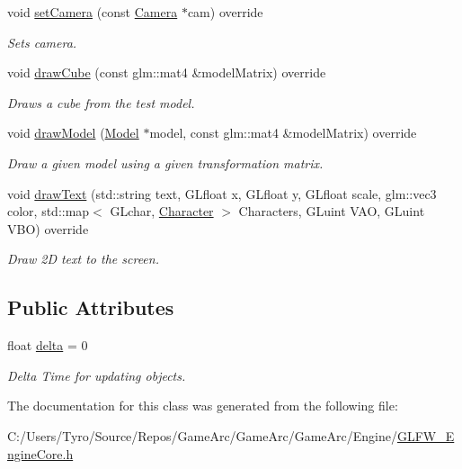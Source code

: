 \begin{DoxyCompactItemize}
void \mbox{\hyperlink{class_g_l_f_w___engine_core_a2aba4fb8a635f96fc4057ba841670a29}{set\+Camera}} (const \mbox{\hyperlink{class_camera}{Camera}} $\ast$cam) override
\begin{DoxyCompactList}\small\item\em Sets camera. \end{DoxyCompactList}\item 
\mbox{\label{class_g_l_f_w___engine_core_a728d1f6ffd1e8526611ab0856db537c0}} 
void \mbox{\hyperlink{class_g_l_f_w___engine_core_a728d1f6ffd1e8526611ab0856db537c0}{draw\+Cube}} (const glm\+::mat4 \&model\+Matrix) override
\begin{DoxyCompactList}\small\item\em Draws a cube from the test model. \end{DoxyCompactList}\item 
\mbox{\label{class_g_l_f_w___engine_core_abee5bb01d70b20b2b3b79e29940a7027}} 
void \mbox{\hyperlink{class_g_l_f_w___engine_core_abee5bb01d70b20b2b3b79e29940a7027}{draw\+Model}} (\mbox{\hyperlink{class_model}{Model}} $\ast$model, const glm\+::mat4 \&model\+Matrix) override
\begin{DoxyCompactList}\small\item\em Draw a given model using a given transformation matrix. \end{DoxyCompactList}\item 
\mbox{\label{class_g_l_f_w___engine_core_a6fe7117af3b6fb2417e0220bc2d0699a}} 
void \mbox{\hyperlink{class_g_l_f_w___engine_core_a6fe7117af3b6fb2417e0220bc2d0699a}{draw\+Text}} (std\+::string text, G\+Lfloat x, G\+Lfloat y, G\+Lfloat scale, glm\+::vec3 color, std\+::map$<$ G\+Lchar, \mbox{\hyperlink{struct_character}{Character}} $>$ Characters, G\+Luint V\+AO, G\+Luint V\+BO) override
\begin{DoxyCompactList}\small\item\em Draw 2D text to the screen. \end{DoxyCompactList}\end{DoxyCompactItemize}
\subsection*{Public Attributes}
\begin{DoxyCompactItemize}
\item 
\mbox{\label{class_g_l_f_w___engine_core_aeffcd56c9c7f9037b3f2207385680f93}} 
float \mbox{\hyperlink{class_g_l_f_w___engine_core_aeffcd56c9c7f9037b3f2207385680f93}{delta}} = 0
\begin{DoxyCompactList}\small\item\em Delta Time for updating objects. \end{DoxyCompactList}\end{DoxyCompactItemize}


The documentation for this class was generated from the following file\+:\begin{DoxyCompactItemize}
\item 
C\+:/\+Users/\+Tyro/\+Source/\+Repos/\+Game\+Arc/\+Game\+Arc/\+Game\+Arc/\+Engine/\mbox{\hyperlink{_g_l_f_w___engine_core_8h}{G\+L\+F\+W\+\_\+\+Engine\+Core.\+h}}\end{DoxyCompactItemize}
